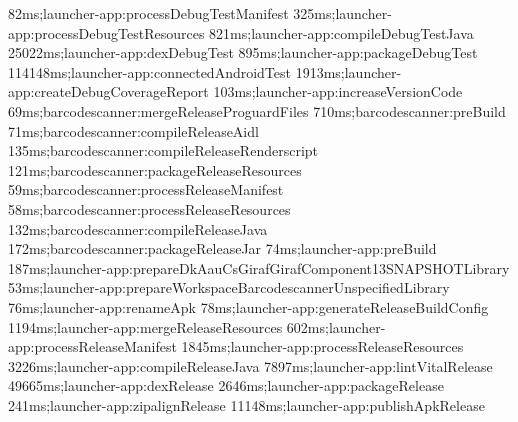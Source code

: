 \begin{gradlecode}[caption=Running time of tasks of new dependency system with full targets,label=lst:full_data_new_dep_system_2]
82ms;launcher-app:processDebugTestManifest
325ms;launcher-app:processDebugTestResources
821ms;launcher-app:compileDebugTestJava
25022ms;launcher-app:dexDebugTest
895ms;launcher-app:packageDebugTest
114148ms;launcher-app:connectedAndroidTest
1913ms;launcher-app:createDebugCoverageReport
103ms;launcher-app:increaseVersionCode
69ms;barcodescanner:mergeReleaseProguardFiles
710ms;barcodescanner:preBuild
71ms;barcodescanner:compileReleaseAidl
135ms;barcodescanner:compileReleaseRenderscript
121ms;barcodescanner:packageReleaseResources
59ms;barcodescanner:processReleaseManifest
58ms;barcodescanner:processReleaseResources
132ms;barcodescanner:compileReleaseJava
172ms;barcodescanner:packageReleaseJar
74ms;launcher-app:preBuild
187ms;launcher-app:prepareDkAauCsGirafGirafComponent13SNAPSHOTLibrary
53ms;launcher-app:prepareWorkspaceBarcodescannerUnspecifiedLibrary
76ms;launcher-app:renameApk
78ms;launcher-app:generateReleaseBuildConfig
1194ms;launcher-app:mergeReleaseResources
602ms;launcher-app:processReleaseManifest
1845ms;launcher-app:processReleaseResources
3226ms;launcher-app:compileReleaseJava
7897ms;launcher-app:lintVitalRelease
49665ms;launcher-app:dexRelease
2646ms;launcher-app:packageRelease
241ms;launcher-app:zipalignRelease
11148ms;launcher-app:publishApkRelease
\end{gradlecode}